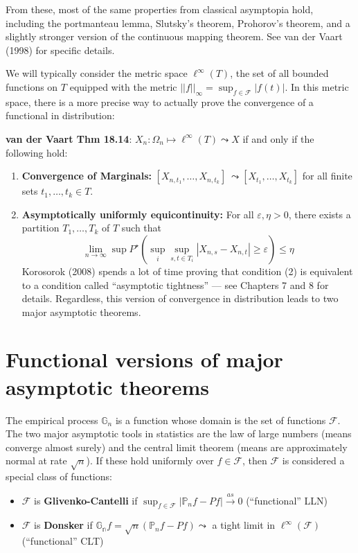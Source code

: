\documentclass[
]{article}
\providecommand{\tightlist}{%
  \setlength{\itemsep}{0pt}\setlength{\parskip}{0pt}}
\begin{document}
From these, most of the same properties from classical asymptopia hold,
including the portmanteau lemma, Slutsky's theorem, Prohorov's theorem,
and a slightly stronger version of the continuous mapping theorem. See
van der Vaart (1998) for specific details.

We will typically consider the metric space \(\ell^{\infty}(T)\), the
set of all bounded functions on \(T\) equipped with the metric
\(||f||_\infty = \sup_{f \in \mathcal{F}} |f(t)|\). In this metric
space, there is a more precise way to actually prove the convergence of
a functional in distribution:

\textbf{van der Vaart Thm 18.14}:
\(X_n : \Omega_n \mapsto \ell^\infty(T) \leadsto X\) if and only if the
following hold: 

\begin{enumerate}
	\item \textbf{Convergence of Marginals:}
	\([X_{n, t_1}, \ldots, X_{n, t_k}]\ \leadsto [X_{t_1},\ldots,X_{t_k}]\)
	for all finite sets \(t_1, \ldots, t_k \in T\).
	\item \textbf{Asymptotically uniformly equicontinuity:} For all
	\(\varepsilon, \eta > 0\), there exists a partition \(T_1, \ldots, T_k\)
	of \(T\) such that
	\[\lim_{n\rightarrow\infty}\sup P^\star(\sup_i\sup_{s,t \in T_i} |X_{n,s} - X_{n,t}|\geq \varepsilon) \leq \eta\]
	Korosorok (2008) spends a lot of time proving that condition (2) is
	equivalent to a condition called ``asymptotic tightness'' --- see
	Chapters 7 and 8 for details. Regardless, this version of convergence in
	distribution leads to two major asymptotic theorems.
\end{enumerate}


\section{Functional versions of major asymptotic theorems}

The empirical process \(\mathbb{G}_n\) is a function whose domain is the
set of functions \(\mathcal{F}\). The two major asymptotic tools in
statistics are the law of large numbers (means converge almost surely)
and the central limit theorem (means are approximately normal at rate
\(\sqrt{n}\)). If these hold uniformly over \(f \in \mathcal{F}\), then
\(\mathcal{F}\) is considered a special class of functions:

\begin{itemize}
\tightlist
\item
  \(\mathcal{F}\) is \textbf{Glivenko-Cantelli} if
  \(\sup_{f \in \mathcal{F}} | \mathbb{P}_n f - Pf| \overset{as}{\rightarrow} 0\)
  (``functional'' LLN)
\item
  \(\mathcal{F}\) is \textbf{Donsker} if
  \(\mathbb{G_n}f = \sqrt{n}(\mathbb{P}_nf - Pf) \leadsto\) a tight
  limit in \(\ell^\infty(\mathcal{F})\) (``functional'' CLT)
\end{itemize}
\end{document}
